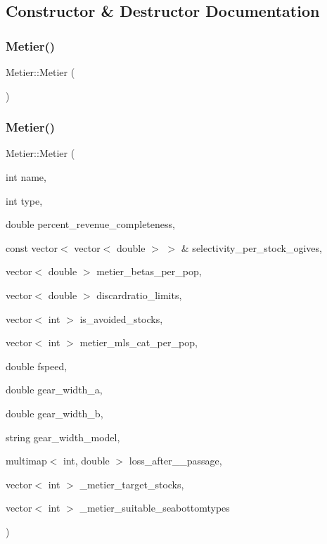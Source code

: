 \subsection{Constructor \& Destructor Documentation}
\mbox{\label{class_metier_afc62233bc20706b775f08a82bfd8fc4b}} 
\subsubsection{\texorpdfstring{Metier()}{Metier()}\hspace{0.1cm}{\footnotesize\ttfamily [1/2]}}
{\footnotesize\ttfamily Metier\+::\+Metier (\begin{DoxyParamCaption}{ }\end{DoxyParamCaption})}

\mbox{\label{class_metier_a362481dafaec1397c8537350038492e6}} 
\subsubsection{\texorpdfstring{Metier()}{Metier()}\hspace{0.1cm}{\footnotesize\ttfamily [2/2]}}
{\footnotesize\ttfamily Metier\+::\+Metier (\begin{DoxyParamCaption}\item[{int}]{name,  }\item[{int}]{type,  }\item[{double}]{percent\+\_\+revenue\+\_\+completeness,  }\item[{const vector$<$ vector$<$ double $>$ $>$ \&}]{selectivity\+\_\+per\+\_\+stock\+\_\+ogives,  }\item[{vector$<$ double $>$}]{metier\+\_\+betas\+\_\+per\+\_\+pop,  }\item[{vector$<$ double $>$}]{discardratio\+\_\+limits,  }\item[{vector$<$ int $>$}]{is\+\_\+avoided\+\_\+stocks,  }\item[{vector$<$ int $>$}]{metier\+\_\+mls\+\_\+cat\+\_\+per\+\_\+pop,  }\item[{double}]{fspeed,  }\item[{double}]{gear\+\_\+width\+\_\+a,  }\item[{double}]{gear\+\_\+width\+\_\+b,  }\item[{string}]{gear\+\_\+width\+\_\+model,  }\item[{multimap$<$ int, double $>$}]{loss\+\_\+after\+\_\+\_\+passage,  }\item[{vector$<$ int $>$}]{\+\_\+metier\+\_\+target\+\_\+stocks,  }\item[{vector$<$ int $>$}]{\+\_\+metier\+\_\+suitable\+\_\+seabottomtypes }\end{DoxyParamCaption})}

